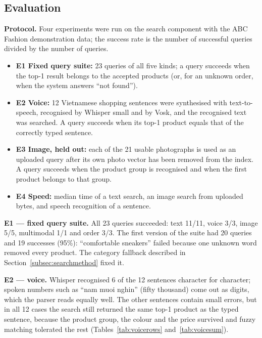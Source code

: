 \subsection{Evaluation}
\label{subsec:searcheval}
\textbf{Protocol.} Four experiments were run on the search component with the ABC Fashion demonstration data; the success rate is the number of successful queries divided by the number of queries.
\begin{itemize}
  \item \textbf{E1 Fixed query suite:} 23 queries of all five kinds; a query succeeds when the top-1 result belongs to the accepted products (or, for an unknown order, when the system answers ``not found'').
  \item \textbf{E2 Voice:} 12 Vietnamese shopping sentences were synthesised with text-to-speech, recognised by Whisper small and by Vosk, and the recognised text was searched. A query succeeds when its top-1 product equals that of the correctly typed sentence.
  \item \textbf{E3 Image, held out:} each of the 21 usable photographs is used as an uploaded query after its own photo vector has been removed from the index. A query succeeds when the product group is recognised and when the first product belongs to that group.
  \item \textbf{E4 Speed:} median time of a text search, an image search from uploaded bytes, and speech recognition of a sentence.
\end{itemize}

\textbf{E1 --- fixed query suite.} All 23 queries succeeded: text 11/11, voice 3/3, image 5/5, multimodal 1/1 and order 3/3. The first version of the suite had 20 queries and 19 successes (95\%): ``comfortable sneakers'' failed because one unknown word removed every product. The category fallback described in Section~\ref{subsec:searchmethod} fixed it.

\textbf{E2 --- voice.} Whisper recognised 6 of the 12 sentences character for character; spoken numbers such as ``nam muoi nghin'' (fifty thousand) come out as digits, which the parser reads equally well. The other sentences contain small errors, but in all 12 cases the search still returned the same top-1 product as the typed sentence, because the product group, the colour and the price survived and fuzzy matching tolerated the rest (Tables~\ref{tab:voicerows} and~\ref{tab:voicesum}).

